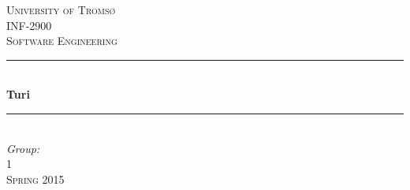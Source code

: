 \documentclass[a4paper]{article}
\begin{document}
\begin{titlepage}

\newcommand{\HRule}{\rule{\linewidth}{0.7mm}} %


\center %
 

\textsc{\LARGE University of Tromsø}\\[1.5cm] %
\textsc{\Large INF-2900}\\[0.5cm] %
\textsc{\large Software Engineering}\\[0.5cm] %


\HRule \\[0.5cm]
{ \huge \bfseries Turi}\\[0.5cm] %
\HRule \\[3cm]
 

\Large \emph{Group:}\\
1\\[2cm] %

\textsc{\large Spring 2015}\\[4cm] %



\end{titlepage}
\end{document}
